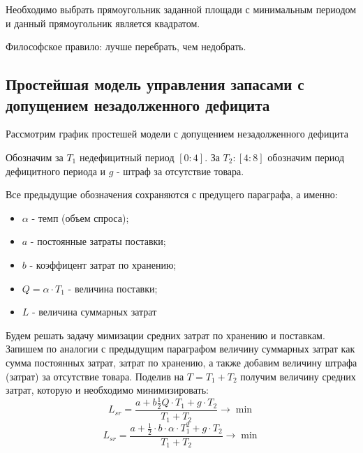 \documentclass[aps,%
12pt,%
final,%
oneside,
onecolumn,%
musixtex, %
superscriptaddress,%
centertags]{article} %
\theoremstyle{plain}
\theoremstyle{definition}
\theoremstyle{remark}
\begin{document}
Необходимо выбрать прямоугольник заданной площади с минимальным периодом и данный прямоугольник является квадратом.

Философское правило: лучше перебрать, чем недобрать.

\newpage
\subsection{Простейшая модель управления запасами с допущением незадолженного дефицита}

Рассмотрим график простешей модели с допущением незадолженного дефицита
\begin{center}
\end{center}

Обозначим за $T_1$ недефицитный период $[0:4]$. За $T_2: [4:8]$ обозначим период дефицитного периода и $g$ - штраф за отсутствие товара.

Все предыдущие обозначения сохраняются с предущего параграфа, а именно:

\begin{itemize}
	\item  $\alpha$ - темп (объем спроса);
	\item  $a$ - постоянные затраты поставки;
	\item  $b$ - коэффицент затрат по хранению;
	\item  $Q = \alpha \cdot T_1$ - величина поставки;
	\item  $L$ - величина суммарных затрат
\end{itemize}

Будем решать задачу мимизации средних затрат по хранению и поставкам. Запишем по аналогии с предыдущим параграфом величину суммарных затрат как сумма постоянных затрат, затрат по хранению, а также добавим величину штрафа (затрат) за отсутствие товара. Поделив на $T=T_1+T_2$ получим величину средних затрат, которую и необходимо минимизировать:
$$L_{sr} = \frac{a+b\frac{1}{2}Q \cdot T_1+g\cdot T_2}{T_1 + T_2} \to \min$$
$$L_{sr} = \frac{a+\frac{1}{2} \cdot b \cdot \alpha \cdot T_1^2 + g\cdot T_2}{T_1 + T_2} \to \min$$
\end{document}
